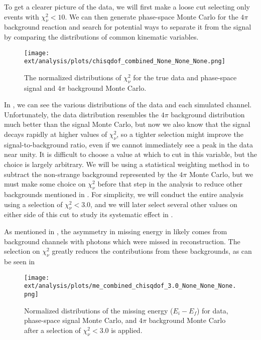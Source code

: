 To get a clearer picture of the data, we will first make a loose cut selecting only events with $\chi^2_\nu < 10$. We can then generate phase-space Monte Carlo for the $4\pi$ background reaction and search for potential ways to separate it from the signal by comparing the distributions of common kinematic variables.

\begin{figure}
  \begin{center}
    \texttt{[image: ext/analysis/plots/chisqdof\_combined\_None\_None\_None.png]}
  \end{center}
  \caption{The normalized distributions of $\chi^2_\nu$ for the true data and phase-space signal and $4\pi$ background Monte Carlo.}\label{fig:data-combined-chisqdof}
\end{figure}

In , we can see the various distributions of the data and each simulated channel. Unfortunately, the data distribution resembles the $4\pi$ background distribution much better than the signal Monte Carlo, but now we also know that the signal decays rapidly at higher values of $\chi^2_\nu$, so a tighter selection might improve the signal-to-background ratio, even if we cannot immediately see a peak in the data near unity. It is difficult to choose a value at which to cut in this variable, but the choice is largely arbitrary. We will be using a statistical weighting method in  to subtract the non-strange background represented by the $4\pi$ Monte Carlo, but we must make some choice on $\chi^2_\nu$ before that step in the analysis to reduce other backgrounds mentioned in . For simplicity, we will conduct the entire analysis using a selection of $\chi^2_\nu < 3.0$, and we will later select several other values on either side of this cut to study its systematic effect in .

As mentioned in , the asymmetry in missing energy in  likely comes from background channels with photons which were missed in reconstruction. The selection on $\chi^2_\nu$ greatly reduces the contributions from these backgrounds, as can be seen in 

\begin{figure}
  \begin{center}
    \texttt{[image: ext/analysis/plots/me\_combined\_chisqdof\_3.0\_None\_None\_None.png]}
  \end{center}
  \caption{Normalized distributions of the missing energy ($E_i - E_f$) for data, phase-space signal Monte Carlo, and $4\pi$ background Monte Carlo after a selection of $\chi^2_\nu < 3.0$ is applied.}\label{fig:me-combined-chisqdof-3.0}
\end{figure}


